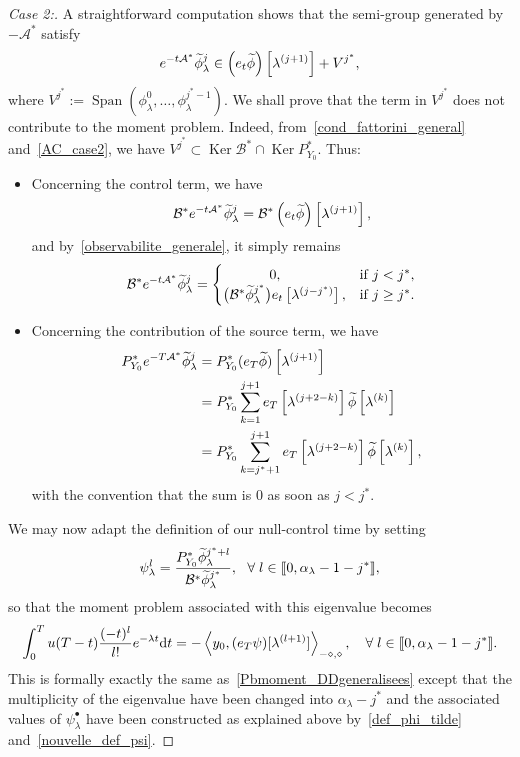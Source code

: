 \documentclass[11pt]{article}
\theoremstyle{definition}
\numberwithin{equation}{section}
\numberwithin{figure}{section}
\numberwithin{table}{section}
\newenvironment{step}[1]{\begin{proof}[#1]}{\let\qed\relax\end{proof}}
\newcommand{\llbracket}{\mathopen{[\mkern -2.7mu[}}
\newcommand{\rrbracket}{\mathclose{]\mkern -2.7mu]}}
\newcommand{\inter}[2]{\llbracket #1,#2 \rrbracket}
\newcommand\As{\mathcal{A}^*}
\newcommand\Bs{\mathcal{B}^*}
\newcommand{\Fzp}{Y_0}
\newcommand{\dual}[2]{\left\langle #1, #2 \right\rangle_{-\diamond,\diamond}}
\newcommand{\PFa}{P_{\Fzp}^*}
\newcommand{\md}{\mathrm{d}}
\DeclareMathOperator{\Span}{Span}
\DeclareMathOperator{\Ker}{Ker}
\renewcommand{\cdot}{{\scriptstyle \bullet}}
\let\oldtilde\tilde
\renewcommand*{\tilde}[1]{\mathchoice{\widetilde{#1}}{\widetilde{#1}}{\oldtilde{#1}}{\oldtilde{#1}}}\let\oldexists\exists
\renewcommand*{\exists}{\mathrel{\oldexists}}
\let\oldforall\forall
\renewcommand*{\forall}{\mathrel{\oldforall}}
\begin{document}
\begin{step}{Case 2:}
A straightforward computation shows that the semi-group generated by $-\As$ satisfy
\[
e^{-t\As} \tilde{\phi}_\lambda^j \in \left(e_t \tilde{\phi}\right)\left[\lambda^{(j+1)}\right] + V^{j^*},
\]
where $V^{j^*} :=
\Span (\phi_\lambda^0,\ldots,\phi_\lambda^{j^*-1})$. We shall prove that the term in $V^{j^*}$ does not contribute to the moment problem. Indeed, from~\eqref{cond_fattorini_general} and~\eqref{AC_case2}, we have $V^{j^*} \subset \Ker \Bs \cap \Ker \PFa$. Thus:
\begin{itemize}
\item Concerning the control term, we have
\[
\Bs e^{-t\As} \tilde{\phi}_\lambda^j = \Bs \left(e_t \tilde{\phi}\right)\left[\lambda^{(j+1)}\right],
\]
and by~\eqref{observabilite_generale}, it simply remains
\[
\Bs e^{-t\As} \tilde{\phi}_\lambda^j =
\begin{cases}
\mkern60mu 0,& \text{if } j<j^*,\\
\big(\Bs \tilde{\phi}_{\lambda}^{j^*}\big) e_t\left[\lambda^{(j-j^*)}\right],& \text{if }j\geq j^*.
\end{cases}
\]
\item Concerning the contribution of the source term, we have
\begin{align*}
\PFa e^{-T\As} \tilde{\phi}_\lambda^j & = \PFa (e_T \tilde{\phi})\left[\lambda^{(j+1)}\right]\\
& = \PFa \sum_{k=1}^{j+1} e_T\left[\lambda^{(j+2-k)}\right] \tilde{\phi}\left[\lambda^{(k)}\right]\\
& = \PFa \sum_{k=j^*+1}^{j+1} e_T\left[\lambda^{(j+2-k)}\right] \tilde{\phi}\left[\lambda^{(k)}\right],
\end{align*}
with the convention that the sum is $0$ as soon as $j<j^*$.
\end{itemize}
We may now adapt the definition of our null-control time by setting
\begin{equation}\label{nouvelle_def_psi}
\psi_\lambda^l = \frac{\PFa \tilde{\phi}_\lambda^{j^*+l}}{\Bs \tilde{\phi}_\lambda^{j^*}}, \ \ \forall l\in \inter{0}{\alpha_\lambda-1-j^*},
\end{equation}
so that the moment problem associated with this eigenvalue becomes
\begin{equation*}
\int_0^T u(T-t) \frac{(-t)^l}{l!} e^{-\lambda t} \md t = -\dual{y_0}{(e_T \psi)[\lambda^{(l+1)}]}, \quad \forall l \in \inter{0}{\alpha_\lambda-1-j^*}.
\end{equation*}
This is formally exactly the same as~\eqref{Pbmoment_DDgeneralisees} except that the multiplicity of the eigenvalue have been changed into $\alpha_\lambda-j^*$ and the associated values of $\psi_\lambda^\cdot$ have been constructed as explained above by~\eqref{def_phi_tilde} and~\eqref{nouvelle_def_psi}.
\end{step}
\end{document}
